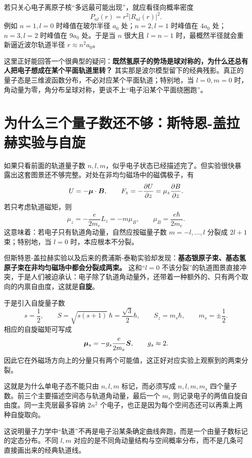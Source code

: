 \documentclass[lang=cn,11pt]{elegantbook}
\begin{document}
若只关心电子离原子核“多远最可能出现”，就应看径向概率密度
\[
P_{nl}(r)=r^2|R_{nl}(r)|^2.
\]
例如 \(n=1,l=0\) 时峰值在玻尔半径 \(a_0\) 处；\(n=2,l=1\) 时峰值在 \(4a_0\) 处；\(n=3,l=2\) 时峰值在 \(9a_0\) 处。于是当 \(n\) 很大且 \(l=n-1\) 时，最概然半径就会重新逼近波尔轨道半径 \(r\approx n^2a_0\)。

\begin{remark}
这里正好能回答一个很典型的疑问：\textbf{既然氢原子的势场是球对称的，为什么还总有人把电子想成在某个平面轨道里转？} 其实那是波尔模型留下的经典残影。真正的量子态是三维波函数分布，不必对应某个平面轨道；特别地，当 \(l=0,m=0\) 时，角动量为零，角分布呈球对称，更谈不上“电子沿某个平面绕圈跑”。
\end{remark}

\section{为什么三个量子数还不够：斯特恩-盖拉赫实验与自旋}

如果只看前面的轨道量子数 \(n,l,m\)，似乎电子状态已经描述完了。但实验很快暴露出这套图景还不够完整。对处在非均匀磁场中的磁偶极子，有
\[
U=-\vb*{\mu}\cdot \vb*{B},
\qquad
F_z=-\pdv{U}{z}=\mu_z\pdv{B}{z}.
\]
若只考虑轨道磁矩，则
\[
\mu_z=-\frac{e}{2m_e}L_z=-m\mu_B,
\qquad
\mu_B=\frac{e\hbar}{2m_e}.
\]
这意味着：若电子只有轨道角动量，自然应按磁量子数 \(m=-l,\dots,l\) 分裂成 \(2l+1\) 束；特别地，当 \(l=0\) 时，本应根本不分裂。

但斯特恩-盖拉赫实验以及后来的费浦斯-泰勒实验却发现：\textbf{基态银原子束、基态氢原子束在非均匀磁场中都会分裂成两束。} 这和“\(l=0\) 不该分裂”的轨道图景直接冲突，于是人们被迫承认：电子除了轨道角动量外，还带着一种额外的、只有两个取向的内禀自由度，这就是\textbf{自旋}。

于是引入自旋量子数
\[
s=\frac12,
\qquad
S=\sqrt{s(s+1)}\,\hbar=\frac{\sqrt3}{2}\hbar,
\qquad
S_z=m_s\hbar,
\qquad
m_s=\pm \frac12.
\]
相应的自旋磁矩可写成
\[
\vb*{\mu}_s=-g_s\frac{e}{2m_e}\vb*{S},
\qquad
g_s\approx 2.
\]
因此它在外磁场方向上的分量只有两个可能值，这正好对应实验上观察到的两束分裂。

\begin{note}
这就是为什么单电子态不能只由 \(n,l,m\) 标记，而必须写成 \(n,l,m,m_s\) 四个量子数。前三个主要描述空间态与轨道角动量，最后一个 \(m_s\) 则记录电子的两值自旋自由度。同一主壳层最多容纳 \(2n^2\) 个电子，也正是因为每个空间态还可以再乘上两种自旋取向。
\end{note}

\begin{remark}
这说明量子力学中“轨道”不再是电子沿某条确定曲线奔跑，而是一个由量子数标记的定态分布。不同 \(l,m\) 对应的是不同角动量结构与空间概率分布，而不是几条可直接画出来的经典轨道线。
\end{remark}
\end{document}
